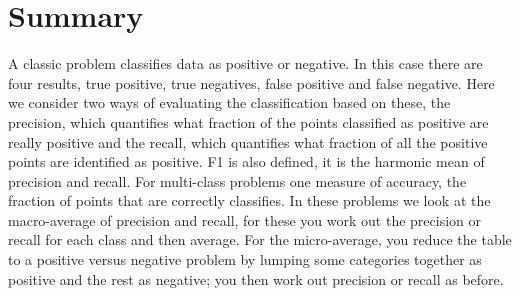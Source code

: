 \documentclass[12pt]{article}
\begin{document}
\section{Summary}
A classic problem classifies data as positive or negative. In this
case there are four results, true positive, true negatives, false
positive and false negative. Here we consider two ways of evaluating
the classification based on these, the precision, which quantifies
what fraction of the points classified as positive are really positive
and the recall, which quantifies what fraction of all the positive
points are identified as positive. F1 is also defined, it is the
harmonic mean of precision and recall. For multi-class problems one
measure of accuracy, the fraction of points that are correctly
classifies. In these problems we look at the macro-average of
precision and recall, for these you work out the precision or recall
for each class and then average. For the micro-average, you reduce the
table to a positive versus negative problem by lumping some categories
together as positive and the rest as negative; you then work out
precision or recall as before.
\end{document}
